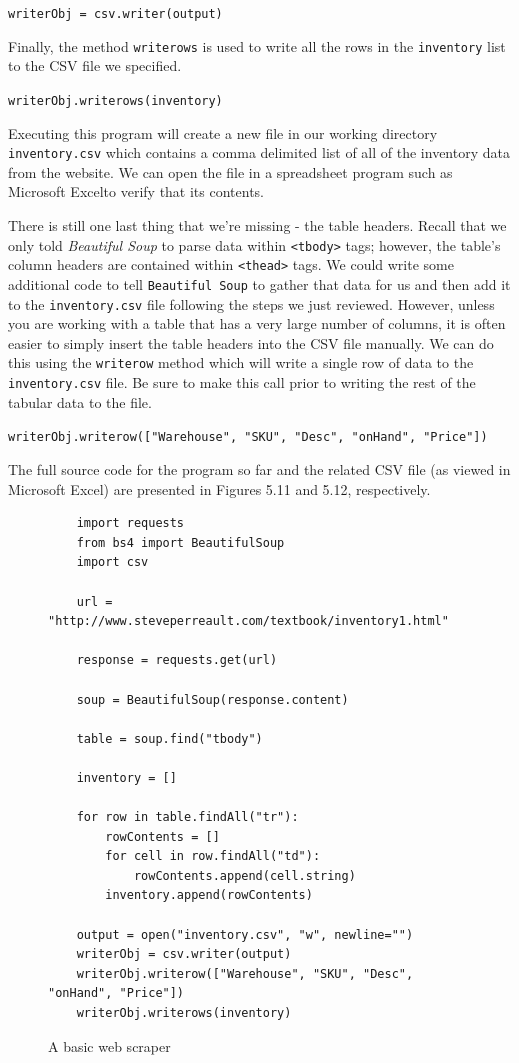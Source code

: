 \documentclass{book}
\begin{document}
\texttt{writerObj = csv.writer(output)}

Finally, the method \texttt{writerows} is used to write all the rows in the \texttt{inventory} list to the CSV file we specified.

\texttt{writerObj.writerows(inventory)}

Executing this program will create a new file in our working directory \texttt{inventory.csv} which contains a comma delimited list of all of the inventory data from the website. We can open the file in a spreadsheet program such as Microsoft Excel\texttrademark to verify that its contents.

There is still one last thing that we're missing - the table headers. Recall that we only told \textit{Beautiful Soup} to parse data within \texttt{<tbody>} tags; however, the table's column headers are contained within \texttt{<thead>} tags. We could write some additional code to tell \texttt{Beautiful Soup} to gather that data for us and then add it to the \texttt{inventory.csv} file following the steps we just reviewed. However, unless you are working with a table that has a very large number of columns, it is often easier to simply insert the table headers into the CSV file manually. We can do this using the \texttt{writerow} method which will write a single row of data to the \texttt{inventory.csv} file. Be sure to make this call prior to writing the rest of the tabular data to the file.

\texttt{writerObj.writerow(["Warehouse", "SKU", "Desc", "onHand", "Price"])}

The full source code for the program so far and the related CSV file (as viewed in Microsoft Excel) are presented in Figures 5.11 and 5.12, respectively.

\begin{figure}[h]
\caption{A basic web scraper}
\begin{lstlisting}
	import requests
	from bs4 import BeautifulSoup
	import csv

	url = "http://www.steveperreault.com/textbook/inventory1.html"

	response = requests.get(url)

	soup = BeautifulSoup(response.content)

	table = soup.find("tbody")

	inventory = []

	for row in table.findAll("tr"):
		rowContents = []
		for cell in row.findAll("td"):
			rowContents.append(cell.string)
		inventory.append(rowContents)

	output = open("inventory.csv", "w", newline="")
	writerObj = csv.writer(output)
	writerObj.writerow(["Warehouse", "SKU", "Desc", "onHand", "Price"])
	writerObj.writerows(inventory)
\end{lstlisting}

\end{figure}
\end{document}
